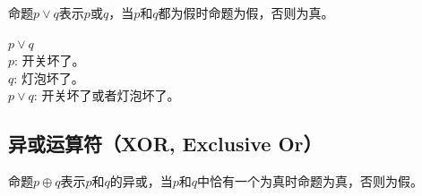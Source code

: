 \documentclass[12pt, openany, oneside]{book}
\begin{document}
命题$ p \vee q $表示$ p $或$ q $，当$ p $和$ q $都为假时命题为假，否则为真。

\begin{table}[H]
    \centering
    \caption{OR真值表}
\end{table}

\begin{tcolorbox}
    $ p \vee q $ \\
    $ p $: 开关坏了。 \\
    $ q $: 灯泡坏了。 \\
    $ p \vee q $: 开关坏了或者灯泡坏了。
\end{tcolorbox}

\subsection{异或运算符（XOR, Exclusive Or）}

命题$ p \oplus q $表示$ p $和$ q $的异或，当$ p $和$ q $中恰有一个为真时命题为真，否则为假。

\begin{table}[H]
    \centering
    \caption{XOR真值表}
\end{table}
\end{document}
